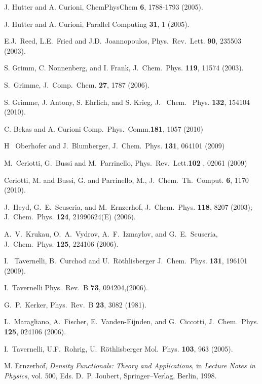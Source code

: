 \documentclass[twoside,10pt,titlepage,a4paper]{article}
\begin{document}
\begin{thebibliography}{999}
 J. Hutter and A. Curioni,
     ChemPhysChem {\bf 6}, 1788-1793 (2005).

 J. Hutter and A. Curioni,
     Parallel Computing {\bf 31}, 1 (2005).

    E.J.~Reed, L.E.~Fried and J.D.~Joannopoulos,
    Phys.~Rev.~Lett. {\bf 90}, 235503 (2003).

    S. Grimm, C. Nonnenberg, and I. Frank, J.~Chem.~Phys. {\bf 119}, 11574 (2003).

    S.~Grimme, J.~Comp.~Chem. {\bf 27}, 1787 (2006).

    S. Grimme, J. Antony, S. Ehrlich, and S. Krieg, J.~ Chem.~ Phys. {\bf 132}, 154104 (2010).

C. Bekas and A. Curioni
Comp.~Phys.~Comm.{\bf 181}, 1057 (2010)

H ~Oberhofer and J.~Blumberger,
J.~Chem.~Phys. {\bf 131}, 064101 (2009)

M.~Ceriotti, G.~Bussi and M.~Parrinello,
Phys.~Rev.~Lett.{\bf 102} , 02061 (2009)

    Ceriotti, M. and Bussi, G. and Parrinello, M.,
    J.~Chem.~Th.~Comput. {\bf 6}, 1170 (2010).

J.~Heyd, G.~E.~Scuseria, and M.~Ernzerhof,
J.~Chem.~Phys. {\bf 118}, 8207 (2003);
J.~Chem.~Phys. {\bf 124}, 21990624(E) (2006).

A.~V.~Krukau, O.~A.~Vydrov, A.~F.~Izmaylov, and G.~E.~Scuseria,
J.~Chem.~Phys. {\bf 125}, 224106 (2006).

I. ~Tavernelli, B.~Curchod and U.~R\"othlisberger
J.~Chem.~Phys. {\bf 131}, 196101 (2009).

I.~Tavernelli
Phys.~Rev.~B  {\bf 73}, 094204,(2006).

    G.~P.~Kerker, Phys.~Rev.~B {\bf 23}, 3082 (1981).

    L.~Maragliano, A.~Fischer, E.~Vanden-Eijnden, and G.~Ciccotti, 
    J.~Chem.~Phys. {\bf 125}, 024106 (2006).

    I.~Tavernelli, U.F.~Rohrig, U.~R\"othlisberger
    Mol.~Phys. {\bf 103}, 963 (2005).

    M. Ernzerhof, {\it Density Functionals: Theory and Applications},
    in {\em Lecture Notes in Physics}, vol. 500, Eds. D.~P. Joubert,
    Springer--Verlag, Berlin, 1998.


\end{thebibliography}
\end{document}
